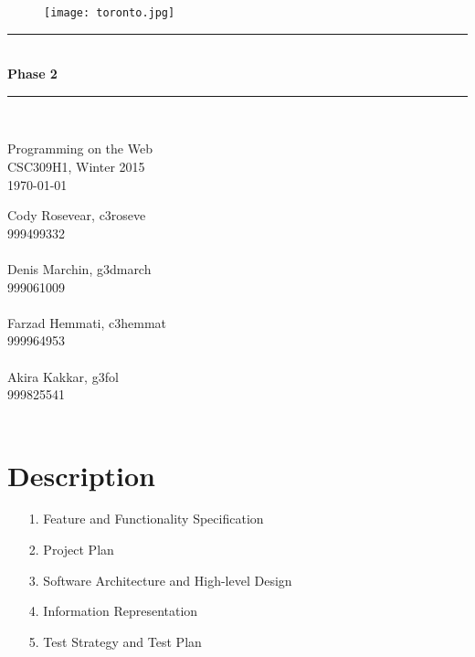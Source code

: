 \documentclass[12pt]{article}
\begin{document}
\begin{titlepage}


\newcommand{\HRule}{\rule{\linewidth}{0.5mm}} %

\center %
 


\begin{figure}[ht!]
\centering
\texttt{[image: toronto.jpg]}
\end{figure}



\HRule \\[0.4cm]
{ \huge \bfseries Phase 2}\\[0.4cm] %
\HRule \\[1.5cm]
 
\begin{minipage}{0.4\textwidth}
\begin{center} \large
Programming on the Web\\
CSC309H1, Winter 2015\\
\today
\end{center}
\end{minipage}


\vfill %


Cody Rosevear, c3roseve\\
999499332\\
\\
Denis Marchin, g3dmarch\\
999061009\\
\\
Farzad Hemmati, c3hemmat\\
999964953\\
\\


Akira Kakkar, g3fol\\
999825541\\
\\



\end{titlepage}
\newpage
\section*{Description}
\begin{enumerate}
\item[1.] Feature and Functionality Specification
\item[2.] Project Plan 
\item[3.] Software Architecture and High-level Design
\item[4.] Information Representation
\item[5.] Test Strategy and Test Plan	
\end{enumerate}
\end{document}
